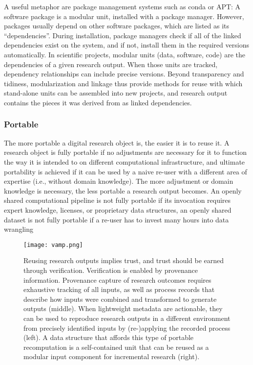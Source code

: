A useful metaphor are package management systems such as conda or APT: A software package is a modular unit, installed with a package manager. However, packages usually depend on other software packages, which are listed as its “dependencies”. During installation, package managers check if all of the linked dependencies exist on the system, and if not, install them in the required versions automatically. In scientific projects, modular units (data, software, code) are the dependencies of a given research output. When those units are tracked, dependency relationships can include precise versions. Beyond transparency and tidiness, modularization and linkage thus provide methods for reuse with which stand-alone units can be assembled into new projects, and research output contains the pieces it was derived from as linked dependencies.


\subsubsection{Portable}

The more portable a digital research object is, the easier it is to reuse it.
A research object is fully portable if no adjustments are necessary for it to function the way it is intended to on different computational infrastructure, and ultimate portability is achieved if it can be used by a naive re-user with a different area of expertise (i.e., without domain knowledge).
The more adjustment or domain knowledge is necessary, the less portable a research output becomes. An openly shared computational pipeline is not fully portable if its invocation requires expert knowledge, licenses, or proprietary data structures, an openly shared dataset is not fully portable if a re-user has to invest many hours into data wrangling


\begin{figure}
	\centering
	\texttt{[image: vamp.png]}
	\caption[DataLad datasets as reusable research objects]{Reusing research outputs implies trust, and trust should be earned through verification. Verification is enabled by provenance information. Provenance capture of research outcomes requires exhaustive tracking of all inputs, as well as process records that describe how inputs were combined and transformed to generate outputs (middle). When lightweight metadata are actionable, they can be used to reproduce research outputs in a different environment from precisely identified inputs by (re-)applying the recorded process (left). A data structure that affords this type of portable recomputation is a self-contained unit that can be reused as a modular input component for incremental research (right).
	}
	\label{fig:ngram}
\end{figure}




